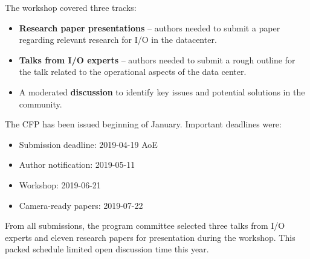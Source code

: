 \documentclass{llncs}
\begin{document}
\noindent The workshop covered three tracks:
\begin{itemize}
  \item \textbf{Research paper presentations} -- authors needed to submit a paper regarding relevant research for I/O in the datacenter.
  \item \textbf{Talks from I/O experts} -- authors needed to submit a rough outline for the talk related to the operational aspects of the data center.
  \item A moderated \textbf{discussion} to identify key issues and potential solutions in the community.
\end{itemize}

\noindent The CFP has been issued beginning of January.
Important deadlines were:
\begin{itemize}
  \item Submission deadline: 2019-04-19  AoE
  \item Author notification: 2019-05-11
  \item Workshop: 2019-06-21
  \item Camera-ready papers: 2019-07-22
\end{itemize}
From all submissions, the program committee selected three  talks from I/O experts and eleven research papers for presentation during the workshop. This packed schedule limited open discussion time this year.
\end{document}
